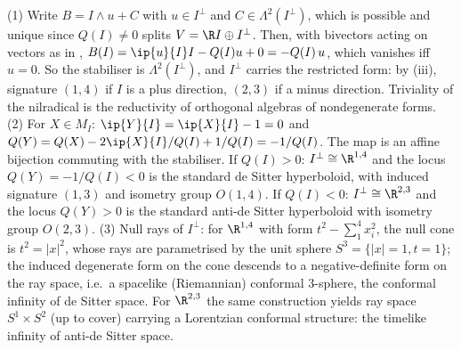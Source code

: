 (1) Write $B = I \wedge u + C$ with $u \in I^\perp$ and $C \in \Lambda^2(I^\perp)$, which is possible and unique since $Q(I) \neq 0$ splits $V = \R I \oplus I^\perp$. Then, with bivectors acting on vectors as in , $B(I) = \ip{u}{I}I - Q(I)u + 0 = -Q(I)\,u$, which vanishes iff $u = 0$. So the stabiliser is $\Lambda^2(I^\perp)$, and $I^\perp$ carries the restricted form: by (iii), signature $(1,4)$ if $I$ is a plus direction, $(2,3)$ if a minus direction. Triviality of the nilradical is the reductivity of orthogonal algebras of nondegenerate forms. (2) For $X \in M_I$: $\ip{Y}{I} = \ip{X}{I} - 1 = 0$ and $Q(Y) = Q(X) - 2\ip{X}{I}/Q(I) + 1/Q(I) = -1/Q(I)$. The map is an affine bijection commuting with the stabiliser. If $Q(I) > 0$: $I^\perp \cong \R^{1,4}$ and the locus $Q(Y) = -1/Q(I) < 0$ is the standard de Sitter hyperboloid, with induced signature $(1,3)$ and isometry group $O(1,4)$. If $Q(I) < 0$: $I^\perp \cong \R^{2,3}$ and the locus $Q(Y) > 0$ is the standard anti-de Sitter hyperboloid with isometry group $O(2,3)$. (3) Null rays of $I^\perp$: for $\R^{1,4}$ with form $t^2 - \sum_1^4 x_i^2$, the null cone is $t^2 = |x|^2$, whose rays are parametrised by the unit sphere $S^3 = \{|x| = 1, t = 1\}$; the induced degenerate form on the cone descends to a negative-definite form on the ray space, i.e.\ a spacelike (Riemannian) conformal $3$-sphere, the conformal infinity of de Sitter space. For $\R^{2,3}$ the same construction yields ray space $S^1 \times S^2$ (up to cover) carrying a Lorentzian conformal structure: the timelike infinity of anti-de Sitter space.
